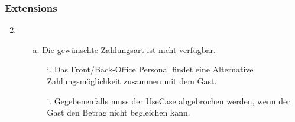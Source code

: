 \documentclass[./detailed_overview_usecases.tex]{subfiles}
\begin{document}
    \subsubsection*{Extensions}
    \begin{enumerate}
        \setcounter{enumi}{1}
        \item \begin{itemize}
                  \item[a.] Die gewünschte Zahlungsart ist nicht verfügbar.
                  \begin{itemize}
                      \item[i.] Das Front/Back-Office Personal findet eine Alternative Zahlungsmöglichkeit zusammen mit dem Gast.
                  \end{itemize}
                  \begin{itemize}
                      \item[i.] Gegebenenfalls muss der UseCase abgebrochen werden, wenn der Gast den Betrag nicht begleichen kann.
                  \end{itemize}
        \end{itemize}
    \end{enumerate}
\end{document}
